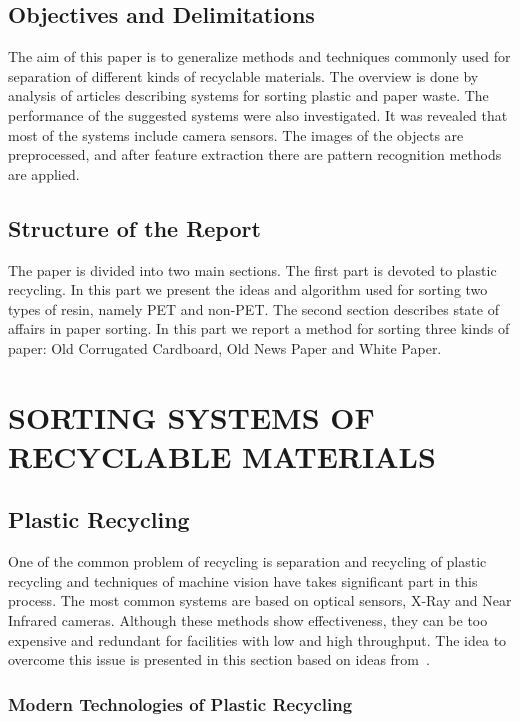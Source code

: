 \documentclass{lutmscthesis}[2010/09/22]
\begin{document}
\subsection{ Objectives and Delimitations }
The aim of this paper is to generalize methods and
techniques commonly used for separation of different
kinds of recyclable materials. The overview
is done by analysis of articles describing
systems for sorting plastic and paper waste. The
performance of the suggested systems were also
investigated. It was revealed that most of
the systems include camera sensors. The images
of the objects are preprocessed, and
after feature extraction there are pattern
recognition methods are applied.

\subsection{ Structure of the Report }
The paper is divided into two main sections. The first part
is devoted to plastic recycling. In this part we present
the ideas and algorithm used for sorting two types of resin,
namely PET and non-PET. The second section describes
state of affairs in paper sorting. In this part
we report a method for sorting three kinds of paper:
Old Corrugated Cardboard, Old News Paper and White Paper.



\section{ SORTING SYSTEMS OF RECYCLABLE MATERIALS }
\subsection{ Plastic Recycling }

One of the common problem of recycling is separation and recycling
of plastic recycling and techniques
of machine vision have takes significant part in this
process. The most common systems are based on optical
sensors, X-Ray and Near Infrared cameras. Although
these methods show effectiveness, they can be too
expensive and redundant for facilities with low and
high throughput. The idea to overcome this issue
is presented in this section based on ideas from~\cite{Wahab:2006}.


\subsubsection*{ Modern Technologies of Plastic Recycling }
\end{document}
